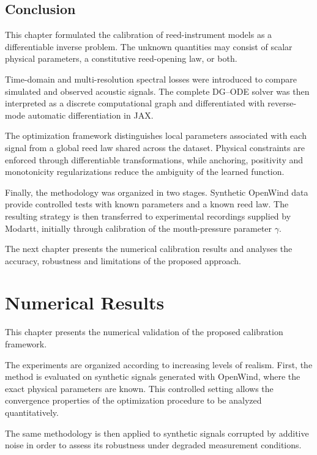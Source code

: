 \documentclass[11pt,a4paper]{report}
\theoremstyle{plain}
\theoremstyle{definition}
\begin{document}
\section{Conclusion}

This chapter formulated the calibration of reed-instrument models as a
differentiable inverse problem. The unknown quantities may consist of scalar
physical parameters, a constitutive reed-opening law, or both.

Time-domain and multi-resolution spectral losses were introduced to compare
simulated and observed acoustic signals. The complete DG--ODE solver was then
interpreted as a discrete computational graph and differentiated with
reverse-mode automatic differentiation in JAX.

The optimization framework distinguishes local parameters associated with each
signal from a global reed law shared across the dataset. Physical constraints
are enforced through differentiable transformations, while anchoring,
positivity and monotonicity regularizations reduce the ambiguity of the learned
function.

Finally, the methodology was organized in two stages. Synthetic OpenWind data
provide controlled tests with known parameters and a known reed law. The
resulting strategy is then transferred to experimental recordings supplied by
Modartt, initially through calibration of the mouth-pressure parameter
\(\gamma\).

The next chapter presents the numerical calibration results and analyses the
accuracy, robustness and limitations of the proposed approach.


\chapter{Numerical Results}

\label{chap:results}

\minitoc

This chapter presents the numerical validation of the proposed calibration
framework.

The experiments are organized according to increasing levels of realism.
First, the method is evaluated on synthetic signals generated with
OpenWind, where the exact physical parameters are known. This controlled
setting allows the convergence properties of the optimization procedure to
be analyzed quantitatively.

The same methodology is then applied to synthetic signals corrupted by
additive noise in order to assess its robustness under degraded
measurement conditions.
\end{document}
